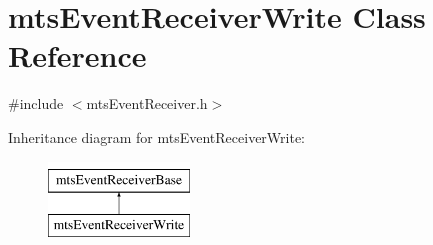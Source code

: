 \hypertarget{classmts_event_receiver_write}{}\section{mts\+Event\+Receiver\+Write Class Reference}
\label{classmts_event_receiver_write}


{\ttfamily \#include $<$mts\+Event\+Receiver.\+h$>$}

Inheritance diagram for mts\+Event\+Receiver\+Write\+:\begin{figure}[H]
\begin{center}
\leavevmode
\includegraphics[height=2.000000cm]{dd/ddf/classmts_event_receiver_write}
\end{center}
\end{figure}
